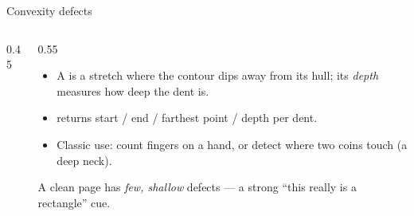 \documentclass[10pt,aspectratio=169]{beamer}
\begin{document}
\begin{frame}{Convexity defects}
  \begin{columns}[T]
    \begin{column}{0.45\textwidth}
    \begin{center}
    \end{center}
    \end{column}
    \begin{column}{0.55\textwidth}
      \begin{itemize}\scriptsize
        \item A  is a stretch where the contour dips away from its hull; its \emph{depth}
              measures how deep the dent is.
        \item {} returns start / end / farthest point / depth per dent.
        \item Classic use: count fingers on a hand, or detect where two coins touch (a deep neck).
      \end{itemize}
      \begin{infobox}
        A clean page has \emph{few, shallow} defects — a strong ``this really is a rectangle'' cue.
      \end{infobox}
    \end{column}
  \end{columns}
\end{frame}
\end{document}

